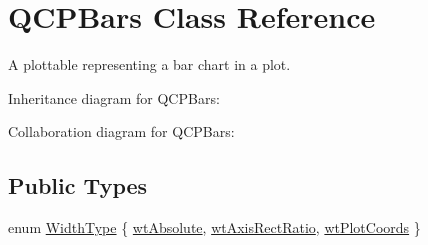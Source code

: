 \hypertarget{class_q_c_p_bars}{}\section{Q\+C\+P\+Bars Class Reference}
\label{class_q_c_p_bars}


A plottable representing a bar chart in a plot.  




Inheritance diagram for Q\+C\+P\+Bars\+:


Collaboration diagram for Q\+C\+P\+Bars\+:
\subsection*{Public Types}
\begin{DoxyCompactItemize}
\item 
enum \hyperlink{class_q_c_p_bars_a65dbbf1ab41cbe993d71521096ed4649}{Width\+Type} \{ \hyperlink{class_q_c_p_bars_a65dbbf1ab41cbe993d71521096ed4649ab74315c9aa77df593c58dd25dfc0de35}{wt\+Absolute}, 
\hyperlink{class_q_c_p_bars_a65dbbf1ab41cbe993d71521096ed4649a90bc09899361ad3422ff277f7c790ffe}{wt\+Axis\+Rect\+Ratio}, 
\hyperlink{class_q_c_p_bars_a65dbbf1ab41cbe993d71521096ed4649aad3cc60ae1bfb1160a30237bee9eaf10}{wt\+Plot\+Coords}
 \}
\end{DoxyCompactItemize}

